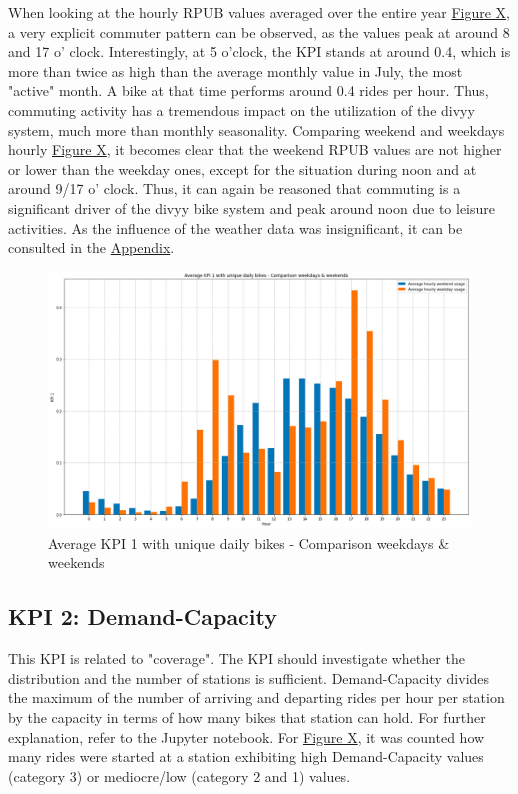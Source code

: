 When looking at the hourly RPUB values averaged over the entire year \hyperref[kpi1abb3]{Figure X}, a very explicit commuter pattern can be observed, as the values peak at around 8 and 17 o' clock. Interestingly, at 5 o'clock, the KPI stands at around 0.4, which is more than twice as high than the average monthly value in July, the most "active" month. A bike at that time performs around 0.4 rides per hour. Thus, commuting activity has a tremendous impact on the utilization of the divyy system, much more than monthly seasonality.
Comparing weekend and weekdays hourly \hyperref[kpi1abb5]{Figure X}, it becomes clear that the weekend RPUB values are not higher or lower than the weekday ones, except for the situation during noon and at around 9/17 o' clock. Thus, it can again be reasoned that commuting is a significant driver of the divyy bike system and peak around noon due to leisure activities. As the influence of the weather data was insignificant, it can be consulted in the \hyperref[APP1]{Appendix}.

\begin{figure}[H]
   \centering
    \includegraphics[width=0.7\linewidth]{./Figures/kpi1abb5.png}
    \caption{Average KPI 1 with unique daily bikes - Comparison weekdays & weekends}
    \label{kpi1abb5}
\end{figure}

\subsection{KPI 2: Demand-Capacity}
\label{subsec:KPI2}

This KPI is related to "coverage". The KPI should investigate whether the distribution and the number of stations is sufficient. Demand-Capacity divides the maximum of the number of arriving and departing rides per hour per station by the capacity in terms of how many bikes that station can hold. For further explanation, refer to the Jupyter notebook. For \hyperref[kpi2abb1]{Figure X}, it was counted how many rides were started at a station exhibiting high Demand-Capacity values (category 3) or mediocre/low (category 2 and 1) values. 

